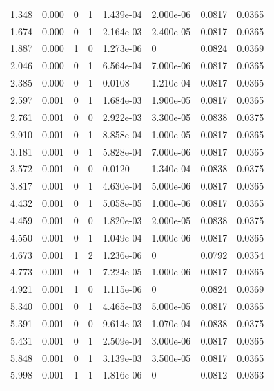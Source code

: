 \documentclass[preview]{standalone}
\begin{document}
{{\begin{tabular}{L{1.2cm}C{1.2cm} C{0.3cm}C{0.5cm} C{1.4cm}C{1.4cm} C{1.4cm}C{1.4cm}}
  1.348  &  0.000  & 0     &  1 &  1.439e-04  & 2.000e-06  & 0.0817 &  0.0365   \\ 
  1.674  &  0.000  & 0     &  1 &  2.164e-03  & 2.400e-05  & 0.0817 &  0.0365   \\ 
  1.887  &  0.000  & 1     &  0 &  1.273e-06  & 0  & 0.0824 &  0.0369   \\ 
  2.046  &  0.000  & 0     &  1 &  6.564e-04  & 7.000e-06  & 0.0817 &  0.0365   \\ 
  2.385  &  0.000  & 0     &  1 &  0.0108  & 1.210e-04  & 0.0817 &  0.0365   \\ 
  2.597  &  0.001  & 0     &  1 &  1.684e-03  & 1.900e-05  & 0.0817 &  0.0365   \\ 
  2.761  &  0.001  & 0     &  0 &  2.922e-03  & 3.300e-05  & 0.0838 &  0.0375   \\ 
  2.910  &  0.001  & 0     &  1 &  8.858e-04  & 1.000e-05  & 0.0817 &  0.0365   \\ 
  3.181  &  0.001  & 0     &  1 &  5.828e-04  & 7.000e-06  & 0.0817 &  0.0365   \\ 
  3.572  &  0.001  & 0     &  0 &  0.0120  & 1.340e-04  & 0.0838 &  0.0375   \\ 
  3.817  &  0.001  & 0     &  1 &  4.630e-04  & 5.000e-06  & 0.0817 &  0.0365   \\ 
  4.432  &  0.001  & 0     &  1 &  5.058e-05  & 1.000e-06  & 0.0817 &  0.0365   \\ 
  4.459  &  0.001  & 0     &  0 &  1.820e-03  & 2.000e-05  & 0.0838 &  0.0375   \\ 
  4.550  &  0.001  & 0     &  1 &  1.049e-04  & 1.000e-06  & 0.0817 &  0.0365   \\ 
  4.673  &  0.001  & 1     &  2 &  1.236e-06  & 0  & 0.0792 &  0.0354   \\ 
  4.773  &  0.001  & 0     &  1 &  7.224e-05  & 1.000e-06  & 0.0817 &  0.0365   \\ 
  4.921  &  0.001  & 1     &  0 &  1.115e-06  & 0  & 0.0824 &  0.0369   \\ 
  5.340  &  0.001  & 0     &  1 &  4.465e-03  & 5.000e-05  & 0.0817 &  0.0365   \\ 
  5.391  &  0.001  & 0     &  0 &  9.614e-03  & 1.070e-04  & 0.0838 &  0.0375   \\ 
  5.431  &  0.001  & 0     &  1 &  2.509e-04  & 3.000e-06  & 0.0817 &  0.0365   \\ 
  5.848  &  0.001  & 0     &  1 &  3.139e-03  & 3.500e-05  & 0.0817 &  0.0365   \\ 
  5.998  &  0.001  & 1     &  1 &  1.816e-06  & 0  & 0.0812 &  0.0363   \\ 

\end{tabular}}}
\end{document}
